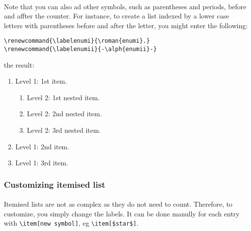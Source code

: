 {\paragraph{}
Note that you can also ad other symbols, such as parentheses and periods,
before and affter the counter. For instance, to create a list indexed by
a lower case letters with parentheses before and after the letter, you
might enter the following:
\begin{verbatim}
\renewcommand{\labelenumi}{\roman{enumi}.}
\renewcommand{\labelenumii}{-\alph{enumii}-}
\end{verbatim}
the result:
\renewcommand{\labelenumi}{\roman{enumi}.}
\renewcommand{\labelenumii}{-\alph{enumii}-}
\begin{enumerate}
	\item Level 1: 1st item.
\begin{enumerate}
	\item Level 2: 1st nested item.
	\item Level 2: 2nd nested item.
	\item Level 2: 3rd nested item.
\end{enumerate}
	\item Level 1: 2nd item.
	\item Level 1: 3rd item.
\end{enumerate}

\subsubsection[Itemised lists]{Customizing itemised list}
\paragraph{}
Itemised lists are not as complex as they do not need to count. Therefore,
to customize, you simply change the labels. It can be done manully for each
entry with \verb|\item[new symbol]|, eg \verb|\item[$star$]|.
}
